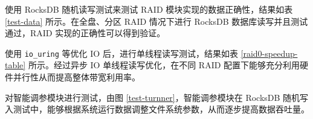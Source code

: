 使用 RocksDB 随机读写测试来测试 RAID 模块实现的数据正确性，结果如表 \ref{test-data} 所示。在全盘、分区 RAID 情况下进行 RocksDB 数据库读写并且测试通过，RAID 实现的正确性可以得到验证。

使用 \verb|io_uring| 等优化 IO 后，进行单线程读写测试，结果如表 \ref{raid0-speedup-table} 所示。经过异步 IO 单线程读写优化，在不同 RAID 配置下能够充分利用硬件并行性从而提高整体带宽利用率。

对智能调参模块进行测试，由图 \ref{test-turnner}，智能调参模块在 RocksDB 随机写入测试中，能够根据系统运行数据调整文件系统参数，从而逐步提高数据吞吐量。